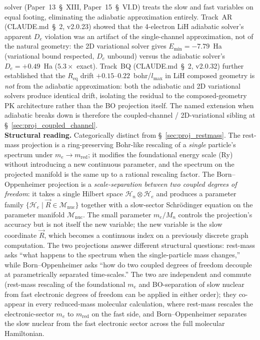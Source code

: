 \documentclass[11pt]{article}
\begin{document}
solver (Paper~13~\S~XIII, Paper~15~\S~VI.D) treats the slow and fast
variables on equal footing, eliminating the adiabatic approximation
entirely.  Track~AR (CLAUDE.md~\S~2, v2.0.23) showed that the 4-electron
LiH adiabatic solver's apparent $D_e$ violation was an artifact of
the single-channel approximation, not of the natural geometry: the 2D
variational solver gives $E_\text{min} = -7.79$~Ha (variational bound
respected, $D_e$ unbound) versus the adiabatic solver's $D_e = +0.49$~Ha
($5.3\times$ exact).  Track~BQ (CLAUDE.md~\S~2, v2.0.32) further
established that the $R_\text{eq}$ drift $+0.15$--$0.22$~bohr/$l_\text{max}$
in LiH composed geometry is \emph{not} from the adiabatic
approximation: both the adiabatic and 2D variational solvers produce
identical drift, isolating the residual to the composed-geometry PK
architecture rather than the BO projection itself.  The named extension
when adiabatic breaks down is therefore the coupled-channel /
2D-variational sibling at \S~\ref{sec:proj_coupled_channel}.\\
\textbf{Structural reading.}  Categorically distinct from
\S~\ref{sec:proj_restmass}.  The rest-mass projection is a
ring-preserving Bohr-like rescaling of a \emph{single} particle's
spectrum under $m_e \to m_\text{red}$; it modifies the foundational
energy scale (Ry) without introducing a new continuous parameter,
and the spectrum on the projected manifold is the same up to a
rational rescaling factor.  The Born--Oppenheimer projection is a
\emph{scale-separation between two coupled degrees of freedom}: it
takes a single Hilbert space $\mathcal{H}_n \otimes \mathcal{H}_e$ and
produces a parameter family $\{ \mathcal{H}_e \mid \vec{R} \in
\mathcal{M}_\text{nuc} \}$ together with a slow-sector Schr\"odinger
equation on the parameter manifold $\mathcal{M}_\text{nuc}$.  The
small parameter $m_e / M_n$ controls the projection's accuracy but is
not itself the new variable; the new variable is the slow coordinate
$\vec{R}$, which becomes a continuous index on a previously discrete
graph computation.  The two projections answer different structural
questions: rest-mass asks ``what happens to the spectrum when the
single-particle mass changes,'' while Born--Oppenheimer asks ``how
do two coupled degrees of freedom decouple at parametrically separated
time-scales.''
The two are independent and commute (rest-mass rescaling of the
foundational $m_e$ and BO-separation of slow nuclear from fast
electronic degrees of freedom can be applied in either order); they
co-appear in every reduced-mass molecular calculation, where
rest-mass rescales the electronic-sector $m_e$ to $m_\text{red}$ on
the fast side, and Born--Oppenheimer separates the slow nuclear from
the fast electronic sector across the full molecular Hamiltonian.
\end{document}
